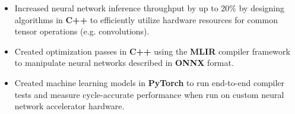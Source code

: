 \documentclass{moderncv}
\begin{document}
{\begin{itemize}
    \item Increased neural network inference throughput by up to 20\% by designing algorithms in \textbf{C++} to efficiently utilize hardware resources for common tensor operations (e.g. convolutions).
    \item Created optimization passes in \textbf{C++} using the \textbf{MLIR} compiler framework to manipulate neural networks described in \textbf{ONNX} format.
    \item Created machine learning models in \textbf{PyTorch} to run end-to-end compiler tests and measure cycle-accurate performance when run on custom neural network accelerator hardware.
\end{itemize}}

\begin{comment}
\cventry{Jan 2020 - Aug 2020}{Software Engineering Co-op - Embedded Systems}{RadComm Systems}{Oakville ON}{}
{\begin{itemize}
    \item Researched cutting-edge radiation analysis techniques using \textbf{GNU Octave} and \textbf{Python} for data visualization to assess development options
\end{itemize}}
\end{comment}

\begin{comment}
\cventry{Sep 2020 - Dec 2020}{Undergraduate Research Assistant}{University of Waterloo}{Waterloo ON}{}
{\begin{itemize}
    \item Implemented novel post-quantum cryptographic algorithms in \textbf{C}
    \item Designed and implemented cache-aware optimizations resulting in 60\% speed improvement
    \item Created custom boolean matrix library for use in cryptographic algorithms
\end{itemize}}
\end{comment}
\end{document}
